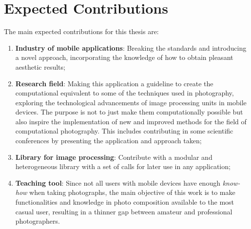 \section{Expected Contributions}
The main expected contributions for this thesis are:
\begin{enumerate}
	\item \textbf{Industry of mobile applications}: Breaking the standards and introducing a novel approach, incorporating the knowledge of how to obtain pleasant aesthetic results;

	\item \textbf{Research field}: Making this application a guideline to create the computational equivalent to some of the techniques used in photography, exploring the technological advancements of image processing units in mobile devices. The purpose is not to just make them computationally possible but also inspire the implementation of new and improved methods for the field of computational photography. This includes contributing in some scientific conferences by presenting the application and  approach taken;
	
	\item \textbf{Library for image processing}: Contribute with a modular and heterogeneous library with a set of calls for later use in any application;
	
	\item \textbf{Teaching tool}: Since not all users with mobile devices have enough \emph{know-how} when taking photographs, the main objective of this work is to make functionalities and knowledge in photo composition available to the most casual user, resulting in a thinner gap between amateur and professional photographers.
\end{enumerate}




